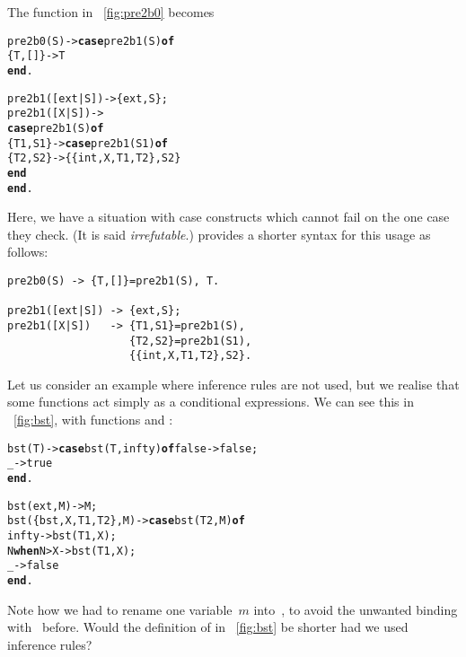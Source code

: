 The function in \fig~\vref{fig:pre2b0} becomes
\begin{alltt}
pre2b0(S) -> \textbf{case} pre2b1(S) \textbf{of}
               \{T,[]\} -> T
             \textbf{end}.

pre2b1([ext|S]) -> \{ext,S\};
pre2b1([X|S])   -> 
  \textbf{case} pre2b1(S) \textbf{of}
    \{T1,S1\} -> \textbf{case} pre2b1(S1) \textbf{of}
                 \{T2,S2\} -> \{\{int,X,T1,T2\},S2\}
               \textbf{end}
  \textbf{end}.
\end{alltt}
Here, we have a situation with case constructs which cannot fail on
the one case they check. (It is said \emph{irrefutable}.) \Erlang
provides a shorter syntax for this usage as follows:
\begin{verbatim}
pre2b0(S) -> {T,[]}=pre2b1(S), T.

pre2b1([ext|S]) -> {ext,S};
pre2b1([X|S])   -> {T1,S1}=pre2b1(S),
                   {T2,S2}=pre2b1(S1),
                   {{int,X,T1,T2},S2}.
\end{verbatim}
Let us consider an example where inference rules are not used, but we
realise that some functions act simply as a conditional expressions. We
can see this in \fig~\vref{fig:bst}, with functions  and
:
\begin{alltt}
bst(T) -> \textbf{case} bst(T,infty) \textbf{of} false -> false;
                                   \_ -> true
          \textbf{end}.

bst(ext,M)           -> M;
bst(\{bst,X,T1,T2\},M) -> \textbf{case} bst(T2,M) \textbf{of}
                                 infty -> bst(T1,X);
                          N \textbf{when} N > X -> bst(T1,X);
                                     \_ -> false
                        \textbf{end}.
\end{alltt}
Note how we had to rename one variable~\(m\) into~, to
avoid the unwanted binding with~ before. Would the
definition of  in \fig~\ref{fig:bst} be shorter had we used
inference rules?

